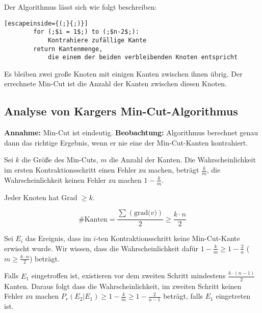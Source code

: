 \documentclass{scrartcl}%
\begin{document}
    Der Algorithmus lässt sich wie folgt beschreiben:

    \begin{lstlisting}[escapeinside={(;}{;)}]
        for (;$i = 1$;) to (;$n-2$;):
            Kontrahiere zufällige Kante
        return Kantenmenge,
            die einem der beiden verbleibenden Knoten entspricht
    \end{lstlisting}

    Es bleiben zwei große Knoten mit einigen Kanten zwischen ihnen übrig.
    Der errechnete Min-Cut ist die Anzahl der Kanten zwischen diesen Knoten.

    \subsection*{Analyse von Kargers Min-Cut-Algorithmus}\label{subsec:analyseVonKargersMincut-algorithmus}

    \textbf{\textsf{Annahme:}}  Min-Cut ist eindeutig.
    \newline
    \textbf{\textsf{Beobachtung:}} Algorithmus berechnet genau dann das richtige Ergebnis, wenn er nie eine der Min-Cut-Kanten kontrahiert.

    Sei $k$ die Größe des Min-Cuts, $m$ die Anzahl der Kanten.
    Die Wahrscheinlichkeit im ersten Kontraktionsschritt einen Fehler zu machen, beträgt $\frac{k}{m}$,
    die Wahrscheinlichkeit keinen Fehler zu machen $1-\frac{k}{m}$.

    {
        Jeder Knoten hat Grad $ \geq k$.

        \begin{equation*}
            \# \text{Kanten} = \frac{\sum_{}^{}(\text{grad($v$)})}{2} \geq \frac{k \cdot n}{2}
        \end{equation*}
    }

    Sei $E_i$ das Ereignis, dass im $i$-ten Kontraktionsschritt keine Min-Cut-Kante erwischt wurde.
    Wir wissen, dass die Wahrscheinlichkeit dafür $1-\frac{k}{m} \geq 1 - \frac{2}{n}$
    ($m \geq \frac{k \cdot n}{2}$) beträgt.

    Falls $E_1$ eingetroffen ist, existieren vor dem zweiten Schritt mindestens $\frac{k \cdot (n-1)}{2}$ Kanten.
    Daraus folgt dass die Wahrscheinlichkeit, im zweiten Schritt keinen Fehler zu machen
    $P_r(E_2 | E_1) \geq 1 - \frac{k}{m} \geq 1 - \frac{2}{n-1}$ beträgt, falls $E_1$ eingetreten ist.
\end{document}
